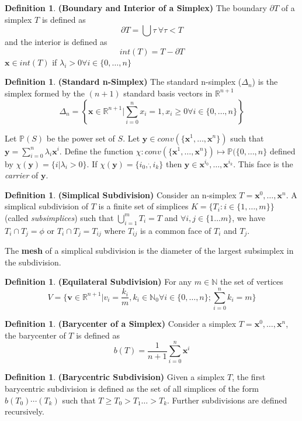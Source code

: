 \documentclass{article}
\theoremstyle{definition}
\newtheorem{defn}[theorem]{Definition}
\begin{document}
\begin{defn}
\textbf{(Boundary and Interior of a Simplex)} The boundary $\partial T$ of a simplex $T$ is defined as $$\partial T = \bigcup \tau ~\forall \tau < T$$ and the interior is defined as $$int(T) = T - \partial T$$ $\mathbf{x}\in int(T)$ if $\lambda_i > 0 \forall i\in\{0,\dots,n\}$ 
\end{defn}
\begin{defn}
\textbf{(Standard n-Simplex)} The standard n-simplex ($\Delta_n$) is the simplex formed by the $(n+1)$ standard basis vectors in $\mathbb{R}^{n+1}$
$$\Delta_n = \left\{\mathbf{x}\in \mathbb{R}^{n+1}\vert \sum_{i=0}^n x_i = 1, x_i\geq 0 \forall i\in\{0,\dots,n\} \right\}$$
\end{defn}
Let $\mathbb{P}(S)$ be the power set of $S$. Let $\mathbf{y} \in conv(\{\mathbf{x}^1,\dots,\mathbf{x}^n\})$ such that $\mathbf{y} = \sum_{i=0}^n \lambda_i \mathbf{x}^i$. Define the function $\chi: conv(\{\mathbf{x}^1,\dots,\mathbf{x}^n\}) \mapsto \mathbb{P}(\{0,\dots,n\}$ defined by $\chi(\mathbf{y}) = \{i\vert \lambda_i>0\}$. If $\chi(\mathbf{y}) = \{i_0,\dot, i_k\}$ then $\mathbf{y} \in \mathbf{x}^{i_0},\dots,\mathbf{x}^{i_k}$. This face is the \textit{carrier} of $\mathbf{y}$.

\begin{defn}
\textbf{(Simplical Subdivision)} Consider an n-simplex $T = \mathbf{x}^0,\dots,\mathbf{x}^n$. A simplical subdivision of $T$ is a finite set of simplices $K = \{ T_i : i\in \{1,\dots, m\}\}$ (called \textit{subsimplices}) such that $\bigcup_{i=1}^{m} T_i = T$ and $\forall i,j \in  \{1\dots m\}$, we have $T_i \cap T_j = \phi$ or $T_i \cap T_j = T_{ij}$ where $T_{ij}$ is a common face of $T_i$ and $T_j$.
\end{defn}
The \textbf{mesh} of a simplical subdivision is the diameter of the largest subsimplex in the subdivision.\\
\begin{defn}
\textbf{(Equilateral Subdivision)} For any $m\in \mathbb{N}$ the set of vertices $$V = \{\mathbf{v} \in \mathbb{R}^{n+1} \vert v_i = \frac{k_i}{m}, k_i\in \mathbb{N}_0 \forall i \in \{0,\dots,n\}; \sum_{i=0}^n k_i = m\}$$
\end{defn}
\begin{defn}
\textbf{(Barycenter of a Simplex)} Consider a simplex $T = \mathbf{x}^0,\dots,\mathbf{x}^n$, the barycenter of $T$ is defined as $$b(T) = \frac{1}{n+1}\sum_{i=0}^n \mathbf{x}^i$$
\end{defn}
\begin{defn}
\textbf{(Barycentric Subdivision)} Given a simplex $T$, the first barycentric subdivision is defined as the set of all simplices of the form $b(T_0)\dotsb(T_k)$ such that $T\geq T_0 >T_1\dots >T_k$. Further subdivisions are defined recursively.
\end{defn}
\end{document}
